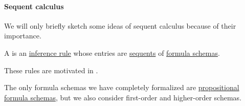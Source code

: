 \paragraph{Sequent calculus}

We will only briefly sketch some ideas of sequent calculus because of their importance.

\begin{definition}\label{def:sequent_calculus_rule}
  A  is an \hyperref[def:inference_rule]{inference rule} whose entries are \hyperref[def:sequent]{sequents} of \hyperref[con:schemas_and_instances]{formula schemas}.
\end{definition}
\begin{comments}
  \item These rules are motivated in .
  \item The only formula schemas we have completely formalized are \hyperref[def:propositional_formula_schema]{propositional formula schemas}, but we also consider first-order and higher-order schemas.
\end{comments}

